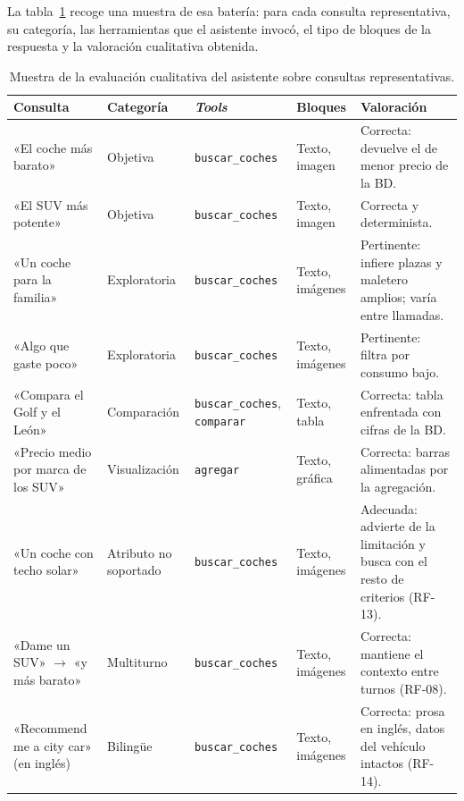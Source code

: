La tabla~\ref{tab:test-cualitativa} recoge una muestra de esa batería: para cada
consulta representativa, su categoría, las herramientas que el asistente invocó,
el tipo de bloques de la respuesta y la valoración cualitativa obtenida.

\begin{table}[H]
\centering
\footnotesize
\renewcommand{\arraystretch}{1.3}
\begin{tabular}{p{3.0cm}p{1.8cm}p{2.4cm}p{2.0cm}p{2.6cm}}
\hline
\textbf{Consulta} & \textbf{Categoría} & \textbf{\emph{Tools}} &
\textbf{Bloques} & \textbf{Valoración} \\
\hline
«El coche más barato» &
Objetiva &
\texttt{buscar\_coches} &
Texto, imagen &
Correcta: devuelve el de menor precio de la BD. \\

«El SUV más potente» &
Objetiva &
\texttt{buscar\_coches} &
Texto, imagen &
Correcta y determinista. \\

«Un coche para la familia» &
Exploratoria &
\texttt{buscar\_coches} &
Texto, imágenes &
Pertinente: infiere plazas y maletero amplios; varía entre llamadas. \\

«Algo que gaste poco» &
Exploratoria &
\texttt{buscar\_coches} &
Texto, imágenes &
Pertinente: filtra por consumo bajo. \\

«Compara el Golf y el León» &
Comparación &
\texttt{buscar\_coches}, \texttt{comparar} &
Texto, tabla &
Correcta: tabla enfrentada con cifras de la BD. \\

«Precio medio por marca de los SUV» &
Visualización &
\texttt{agregar} &
Texto, gráfica &
Correcta: barras alimentadas por la agregación. \\

«Un coche con techo solar» &
Atributo no soportado &
\texttt{buscar\_coches} &
Texto, imágenes &
Adecuada: advierte de la limitación y busca con el resto de criterios (RF-13). \\

«Dame un SUV» $\to$ «y más barato» &
Multiturno &
\texttt{buscar\_coches} &
Texto, imágenes &
Correcta: mantiene el contexto entre turnos (RF-08). \\

«Recommend me a city car» (en inglés) &
Bilingüe &
\texttt{buscar\_coches} &
Texto, imágenes &
Correcta: prosa en inglés, datos del vehículo intactos (RF-14). \\
\hline
\end{tabular}
\caption{Muestra de la evaluación cualitativa del asistente sobre consultas
representativas.}
\label{tab:test-cualitativa}
\end{table}

